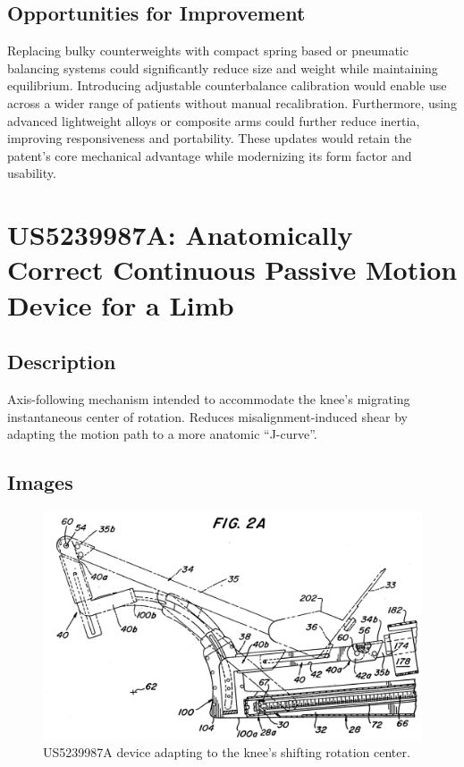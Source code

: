 \documentclass[11pt]{article}
\begin{document}
\subsection{Opportunities for Improvement}
Replacing bulky counterweights with compact spring based or pneumatic balancing systems could significantly reduce size and weight while maintaining equilibrium. Introducing adjustable counterbalance calibration would enable use across a wider range of patients without manual recalibration. Furthermore, using advanced lightweight alloys or composite arms could further reduce inertia, improving responsiveness and portability. These updates would retain the patent's core mechanical advantage while modernizing its form factor and usability.

\section{US5239987A: Anatomically Correct Continuous Passive Motion Device for a Limb}
\subsection{Description}
Axis-following mechanism intended to accommodate the knee’s migrating instantaneous center of rotation. Reduces misalignment-induced shear by adapting the motion path to a more anatomic \enquote{J-curve}.
\subsection{Images}
\begin{figure}[H]
  \centering
  \includegraphics[width=0.54\linewidth]{US5239987-drawings-page-3.png}
  \caption{US5239987A device adapting to the knee’s shifting rotation center.}
  \label{fig:US5239987A}
\end{figure}
\end{document}
